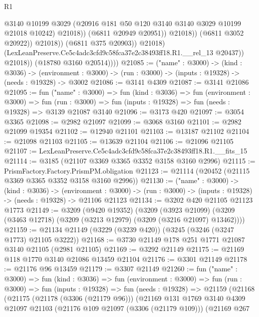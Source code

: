 \begin{lexlean}{R1}
\begin{coremodule}
                                    @3140
                                    @10199
                                    @3029
                                    (@20916 @181 @50 @120 @3140 @3140 @3029 @10199 @21018 @10242)
                                    @21018))
                                (@6811 @20949 @20951))
                              @21018))
                          (@6811 @3052 @20922))
                        @21018))
                    (@6811 @375 @20903))
                  @21018)
                (LexLeanPreserve.Ce5c4adc3cfd9c58fca37e2c38493ff18.R1.__rel_13 @20437))
              @21018))
          (@18780 @3160 @20514))))
@21085 := ("name" : @3000) ->
  (kind : @3036) ->
  (environment : @3000) -> (run : @3000) -> (inputs : @19328) -> (needs : @19328) -> @3002
@21086 := @3141 @4309
@21087 := @3141 @21086
@21095 := fun ("name" : @3000) =>
  fun (kind : @3036) =>
  fun (environment : @3000) =>
  fun (run : @3000) => fun (inputs : @19328) => fun (needs : @19328) => @3139 @21087 @3140
@21096 := @3173 @420
@21097 := @3054 @3365
@21098 := @2982 @21097
@21099 := @3068 @3160
@21101 := @2982 @21099 @19354
@21102 := @12940 @21101
@21103 := @13187 @21102
@21104 := @21098 @21103
@21105 := @13639 @21104
@21106 := @21096 @21105
@21107 := LexLeanPreserve.Ce5c4adc3cfd9c58fca37e2c38493ff18.R1.__fits_15
@21114 := @3185 (@21107 @3369 @3365 @3352 @3158 @3160 @2996)
@21115 := PrismFactory.Factory.PrismPM.obligation
@21123 := @21114 (@20452 (@21115 @3369 @3365 @3352 @3158 @3160 @2996))
@21130 := ("name" : @3000) ->
  (kind : @3036) ->
  (environment : @3000) -> (run : @3000) -> (inputs : @19328) -> (needs : @19328) -> @21106 @21123
@21134 := @3202 @420 @21105 @21123 @1773
@21149 := @3209
    (@9420 @19352)
    (@3209
      (@3923 @21099)
      (@3209 (@3463 @12718) (@3209 (@3213 @12979) (@3209 (@3216 @21097) @13462))))
@21159 := @21134 @21149 (@3229 (@3239 @420)) (@3245 (@3246 (@3247 @1773) @21105 @3222))
@21168 := @3730 @21149 @178 @251 @1771 @21087 @3140 @21105 (@2981 @21105)
@21169 := @3292 @21149
@21175 := @21169 @118 @1770 @3140 @21086 @13459 @21104
@21176 := @3301 @21149
@21178 := @21176 @96 @13459
@21179 := @3307 @21149
@21260 := fun ("name" : @3000) =>
  fun (kind : @3036) =>
  fun (environment : @3000) =>
  fun (run : @3000) =>
  fun (inputs : @19328) =>
  fun (needs : @19328) =>
  @21159
    (@21168
      (@21175
        (@21178 (@3306 (@21179 @96)))
        (@21169
          @131
          @1769
          @3140
          @4309
          @21097
          @21103
          (@21176 @109 @21097 (@3306 (@21179 @109)))
          (@21169
            @267

\end{coremodule}
\end{lexlean}
